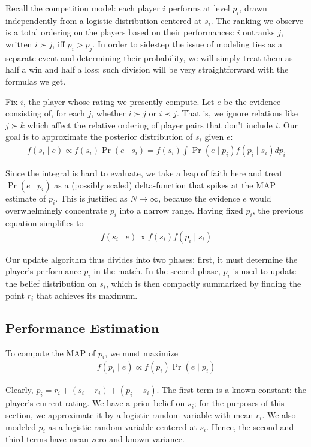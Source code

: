 \documentclass{article}
\begin{document}
Recall the competition model: each player $i$ performs at level $p_i$, drawn independently from a logistic distribution centered at $s_i$. The ranking we observe is a total ordering on the players based on their performances: $i$ outranks $j$, written $i \succ j$, iff $p_i > p_j$. In order to sidestep the issue of modeling ties as a separate event and determining their probability, we will simply treat them as half a win and half a loss; such division will be very straightforward with the formulas we get.

Fix $i$, the player whose rating we presently compute. Let $e$ be the evidence consisting of, for each $j$, whether $i \succ j$ or $i \prec j$. That is, we ignore relations like $j \succ k$ which affect the relative ordering of player pairs that don't include $i$. Our goal is to approximate the posterior distribution of $s_i$ given $e$:
\begin{align}
f(s_i\mid e) \propto f(s_i)\Pr(e\mid s_i) = f(s_i)\int \Pr(e\mid p_i)f(p_i\mid s_i)dp_i
\end{align}

Since the integral is hard to evaluate, we take a leap of faith here and treat $\Pr(e\mid p_i)$ as a (possibly scaled) delta-function that spikes at the MAP estimate of $p_i$. This is justified as $N \rightarrow \infty$, because the evidence $e$ would overwhelmingly concentrate $p_i$ into a narrow range. Having fixed $p_i$, the previous equation simplifies to
\begin{align}
f(s_i\mid e) \propto f(s_i)f(p_i\mid s_i)
\end{align}

Our update algorithm thus divides into two phases: first, it must determine the player's performance $p_i$ in the match. In the second phase, $p_i$ is used to update the belief distribution on $s_i$, which is then compactly summarized by finding the point $r_i$ that achieves its maximum.

\subsection{Performance Estimation}

To compute the MAP of $p_i$, we must maximize
\begin{align}
f(p_i\mid e) \propto f(p_i) \Pr(e\mid p_i)
\end{align}

Clearly, $p_i = r_i + (s_i-r_i) + (p_i-s_i)$. The first term is a known constant: the player's current rating. We have a prior belief on $s_i$; for the purposes of this section, we approximate it by a logistic random variable with mean $r_i$. We also modeled $p_i$ as a logistic random variable centered at $s_i$. Hence, the second and third terms have mean zero and known variance.
\end{document}
